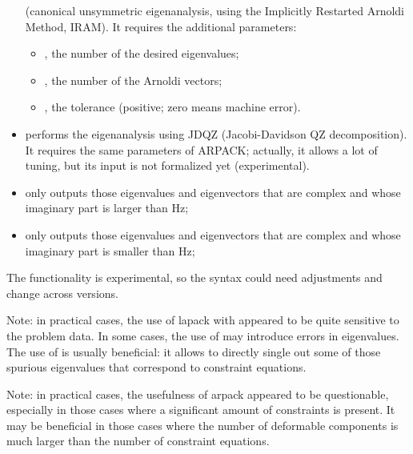 \begin{itemize}
	(canonical unsymmetric eigenanalysis,
	using the Implicitly Restarted Arnoldi Method, IRAM).
	It requires the additional parameters:
	\begin{itemize}
	\item {}, the number of the desired eigenvalues;
	\item {}, the number of the Arnoldi vectors;
	\item {}, the tolerance (positive; zero means machine error).
	\end{itemize}
\item {} performs the eigenanalysis using JDQZ (Jacobi-Davidson QZ
	decomposition).
	It requires the same parameters of ARPACK;
	actually, it allows a lot of tuning, but its input
	is not formalized yet (experimental).
\item {} only outputs those eigenvalues and eigenvectors
	that are complex and whose imaginary part is larger than
	 Hz;
\item {} only outputs those eigenvalues and eigenvectors
	that are complex and whose imaginary part is smaller than
	 Hz;
\end{itemize}
The  functionality is experimental,
so the syntax could need adjustments and change across versions.

Note: in practical cases, the use of lapack with 
appeared to be quite sensitive to the problem data.
In some cases, the use of  may introduce errors
in eigenvalues.
The use of  is usually beneficial: it allows to directly
single out some of those spurious eigenvalues that correspond
to constraint equations.

Note: in practical cases, the usefulness of arpack appeared
to be questionable, especially in those cases where a significant amount
of constraints is present.
It may be beneficial in those cases where the number of deformable components
is much larger than the number of constraint equations.


